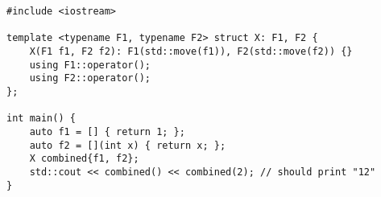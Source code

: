\begin{lstlisting}[title=\href{https://godbolt.org/z/qrex3v}{\texttt{godbolt.org/z/qrex3v}}]
#include <iostream>

template <typename F1, typename F2> struct X: F1, F2 {
    X(F1 f1, F2 f2): F1(std::move(f1)), F2(std::move(f2)) {}
    using F1::operator();
    using F2::operator();
};

int main() {
    auto f1 = [] { return 1; };
    auto f2 = [](int x) { return x; };
    X combined{f1, f2};
    std::cout << combined() << combined(2); // should print "12"
}
\end{lstlisting}

